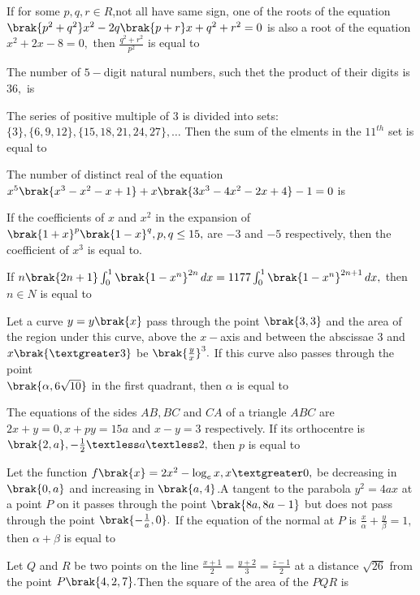 \iffalse
    \title{2022}
    \author{EE24BTECH11029}
    \section{integer}
\fi 

 \item If for some $p,q,r\in R$,not all have same  sign, one of the roots of the equation $\brak{p^2+q^2}x^2-2q\brak{p+r}x+q^2+r^2=0$ is also a root of the equation $x^2+2x-8=0,$ then $\frac{q^2+r^2}{p^2}$ is equal to\\
    \item The number of $5-$digit natural numbers, such thet the product of their digits is $36,$ is\\
    \item The series of positive multiple of $3$ is divided into sets: $\{3\},\{6,9,12\},\{15,18,21,24,27\},\dots$ Then the sum of the elments in the $11^{th}$ set is equal to\\
    \item The number of distinct real of the equation $x^5\brak{x^3-x^2-x+1} +x\brak{3x^3-4x^2-2x+4}-1=0$ is\\
    \item If the coefficients of $x$ and $x^2$ in the expansion of $\brak{1+x}^p\brak{1-x}^q,p,q\le 15,$ are $-3$ and $-5$ respectively, then the coefficient of $x^3$ is equal to.\\
    \item If $n\brak{2n+1}\int_{0}^{1}\brak{1-x^n}^{2n}\,dx=1177\int_{0}^{1}\brak{1-x^n}^{2n+1}\,dx,$ then $n\in N$ is equal to\\
    \item Let a curve $y=y\brak{x}$ pass through the point $\brak{3,3}$ and the area of the region under this curve, above the $x-$axis and between the abscissae $3$ and $x\brak{\textgreater 3}$ be $\brak{\frac{y}{x}}^3.$ If this curve also passes through the point\\ $\brak{\alpha,6\sqrt{10}}$ in the first quadrant, then $\alpha$ is equal to\\
    \item The equations of the sides $AB,BC$ and $CA$ of a triangle $ABC$ are $2x+y=0,x+py=15a$ and $x-y=3$ respectively. If its orthocentre is $\brak{2,a},-\frac{1}{2} \textless a \textless 2,$ then $p$ is equal to\\
    \item Let the function $f\brak{x}=2x^2-\log_e{x},x\textgreater0,$ be decreasing in $\brak{0,a}$ and increasing in $\brak{a,4}$.A tangent to the parabola $y^2=4ax$ at a point $P$ on it passes through the point $\brak{8a,8a-1}$ but does not pass through the point $\brak{-\frac{1}{a},0}.$ If the equation of the normal at $P$ is $\frac{x}{\alpha}+\frac{y}{\beta}=1,$ then $\alpha+\beta$ is equal to\\
    \item Let $Q$ and $R$ be two points on the line $\frac{x+1}{2}=\frac{y+2}{3}=\frac{z-1}{2}$ at a distance $\sqrt{26}$ from the point $P\brak{4,2,7}.$Then the square of the area of the $PQR$ is
